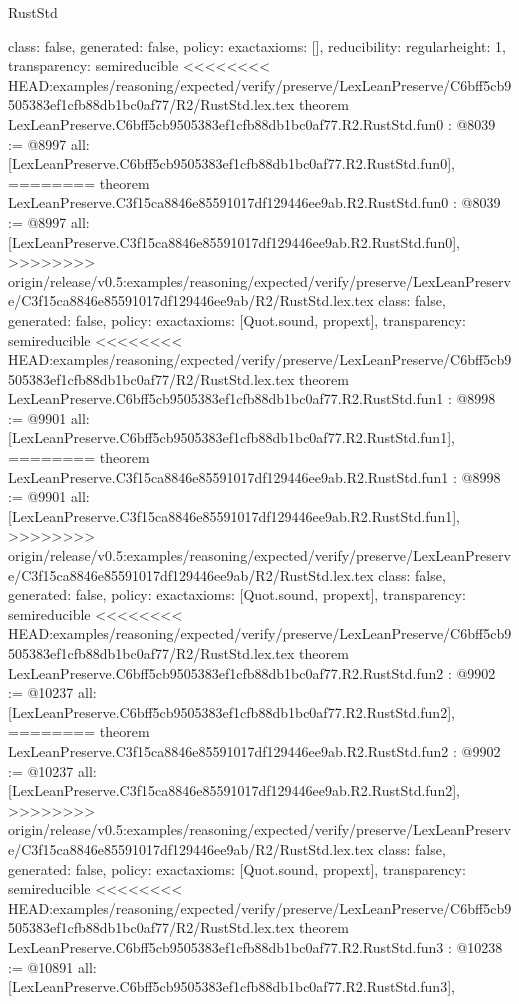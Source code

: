 \begin{lexlean}{RustStd}
\begin{coremodule}
{\begin{coremodule}
{{{  class: false,
  generated: false,
  policy: exact{axioms: []},
  reducibility: regular{height: 1},
  transparency: semireducible
}
<<<<<<<< HEAD:examples/reasoning/expected/verify/preserve/LexLeanPreserve/C6bff5cb9505383ef1cfb88db1bc0af77/R2/RustStd.lex.tex
theorem LexLeanPreserve.C6bff5cb9505383ef1cfb88db1bc0af77.R2.RustStd.fun0 : @8039 := @8997 {
  all: [LexLeanPreserve.C6bff5cb9505383ef1cfb88db1bc0af77.R2.RustStd.fun0],
========
theorem LexLeanPreserve.C3f15ca8846e85591017df129446ee9ab.R2.RustStd.fun0 : @8039 := @8997 {
  all: [LexLeanPreserve.C3f15ca8846e85591017df129446ee9ab.R2.RustStd.fun0],
>>>>>>>> origin/release/v0.5:examples/reasoning/expected/verify/preserve/LexLeanPreserve/C3f15ca8846e85591017df129446ee9ab/R2/RustStd.lex.tex
  class: false,
  generated: false,
  policy: exact{axioms: [Quot.sound, propext]},
  transparency: semireducible
}
<<<<<<<< HEAD:examples/reasoning/expected/verify/preserve/LexLeanPreserve/C6bff5cb9505383ef1cfb88db1bc0af77/R2/RustStd.lex.tex
theorem LexLeanPreserve.C6bff5cb9505383ef1cfb88db1bc0af77.R2.RustStd.fun1 : @8998 := @9901 {
  all: [LexLeanPreserve.C6bff5cb9505383ef1cfb88db1bc0af77.R2.RustStd.fun1],
========
theorem LexLeanPreserve.C3f15ca8846e85591017df129446ee9ab.R2.RustStd.fun1 : @8998 := @9901 {
  all: [LexLeanPreserve.C3f15ca8846e85591017df129446ee9ab.R2.RustStd.fun1],
>>>>>>>> origin/release/v0.5:examples/reasoning/expected/verify/preserve/LexLeanPreserve/C3f15ca8846e85591017df129446ee9ab/R2/RustStd.lex.tex
  class: false,
  generated: false,
  policy: exact{axioms: [Quot.sound, propext]},
  transparency: semireducible
}
<<<<<<<< HEAD:examples/reasoning/expected/verify/preserve/LexLeanPreserve/C6bff5cb9505383ef1cfb88db1bc0af77/R2/RustStd.lex.tex
theorem LexLeanPreserve.C6bff5cb9505383ef1cfb88db1bc0af77.R2.RustStd.fun2 : @9902 := @10237 {
  all: [LexLeanPreserve.C6bff5cb9505383ef1cfb88db1bc0af77.R2.RustStd.fun2],
========
theorem LexLeanPreserve.C3f15ca8846e85591017df129446ee9ab.R2.RustStd.fun2 : @9902 := @10237 {
  all: [LexLeanPreserve.C3f15ca8846e85591017df129446ee9ab.R2.RustStd.fun2],
>>>>>>>> origin/release/v0.5:examples/reasoning/expected/verify/preserve/LexLeanPreserve/C3f15ca8846e85591017df129446ee9ab/R2/RustStd.lex.tex
  class: false,
  generated: false,
  policy: exact{axioms: [Quot.sound, propext]},
  transparency: semireducible
}
<<<<<<<< HEAD:examples/reasoning/expected/verify/preserve/LexLeanPreserve/C6bff5cb9505383ef1cfb88db1bc0af77/R2/RustStd.lex.tex
theorem LexLeanPreserve.C6bff5cb9505383ef1cfb88db1bc0af77.R2.RustStd.fun3 : @10238 := @10891 {
  all: [LexLeanPreserve.C6bff5cb9505383ef1cfb88db1bc0af77.R2.RustStd.fun3],
}}}}}}
\end{coremodule}}
\end{coremodule}
\end{lexlean}
